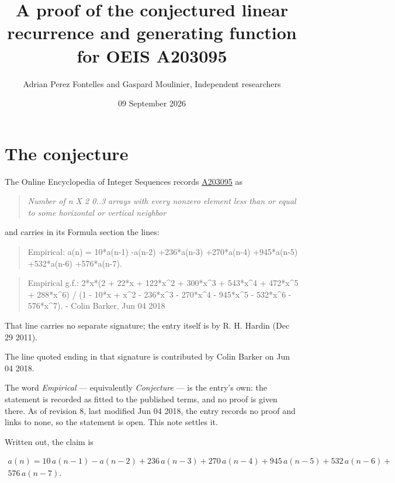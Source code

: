 \documentclass[11pt]{article}
\title{A proof of the conjectured linear recurrence and generating function for OEIS A203095}
\author{Adrian Perez Fontelles and Gaspard Moulinier, Independent researchers}
\date{09 September 2026}
\theoremstyle{definition}
\begin{document}
\maketitle
\section{The conjecture}

The Online Encyclopedia of Integer Sequences records \href{https://oeis.org/A203095}{A203095} as

\begin{quote}\itshape Number of n X 2 0..3 arrays with every nonzero element less than or equal to some horizontal or vertical neighbor\end{quote}

and carries in its Formula section the lines:

\begin{quote}\ttfamily Empirical: a(n) = 10*a(n-1) -a(n-2) +236*a(n-3) +270*a(n-4) +945*a(n-5) +532*a(n-6) +576*a(n-7).\end{quote}

\begin{quote}\ttfamily Empirical g.f.: 2*x*(2 + 22*x + 122*x\textasciicircum{}2 + 300*x\textasciicircum{}3 + 543*x\textasciicircum{}4 + 472*x\textasciicircum{}5 + 288*x\textasciicircum{}6) / (1 - 10*x + x\textasciicircum{}2 - 236*x\textasciicircum{}3 - 270*x\textasciicircum{}4 - 945*x\textasciicircum{}5 - 532*x\textasciicircum{}6 - 576*x\textasciicircum{}7). - Colin Barker, Jun 04 2018\end{quote}

That line carries no separate signature; the entry itself is by R. H. Hardin (Dec 29 2011).

The line quoted ending in that signature is contributed by Colin Barker on Jun 04 2018.

The word {\itshape Empirical} --- equivalently {\itshape Conjecture} --- is the entry's own: the statement is recorded as fitted to the published terms, and no proof is given there. As of revision 8, last modified Jun 04 2018, the entry records no proof and links to none, so the statement is open. This note settles it.

Written out, the claim is

\begin{multline*} a(n) = 10\,a(n-1) - a(n-2) + 236\,a(n-3) + 270\,a(n-4) + 945\,a(n-5) + 532\,a(n-6) + \\ 576\,a(n-7). \end{multline*}
\end{document}
